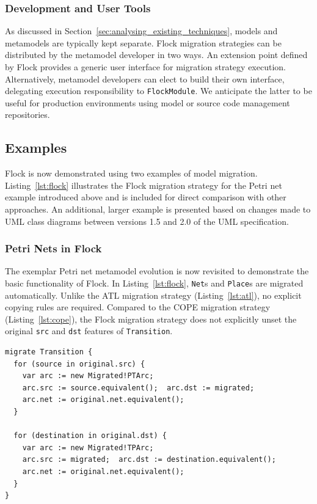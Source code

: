 \subsubsection{Development and User Tools}
As discussed in Section~\ref{sec:analysing_existing_techniques}, models and metamodels are typically kept separate. Flock migration strategies can be distributed by the metamodel developer in two ways. An extension point defined by Flock provides a generic user interface for migration strategy execution. Alternatively, metamodel developers can elect to build their own interface, delegating execution responsibility to \texttt{FlockModule}. We anticipate the latter to be useful for production environments using model or source code management repositories.


\subsection{Examples}
\label{subsec:flock_examples}
Flock is now demonstrated using two examples of model migration. Listing~\ref{lst:flock} illustrates the Flock migration strategy for the Petri net example introduced above and is included for direct comparison with other approaches. An additional, larger example is presented based on changes made to UML class diagrams between versions 1.5 and 2.0 of the UML specification.

\subsubsection{Petri Nets in Flock}
The exemplar Petri net metamodel evolution is now revisited to demonstrate the basic functionality of Flock. In Listing~\ref{lst:flock}, \texttt{Net}s and \texttt{Place}s are migrated automatically. Unlike the ATL migration strategy (Listing~\ref{lst:atl}), no explicit copying rules are required. Compared to the COPE migration strategy (Listing~\ref{lst:cope}), the Flock migration strategy does not explicitly unset the original \texttt{src} and \texttt{dst} features of \texttt{Transition}.

\begin{lstlisting}[caption=Petri nets model migration in Flock, label=lst:flock, language=Flock]
migrate Transition {
  for (source in original.src) {
    var arc := new Migrated!PTArc;
    arc.src := source.equivalent();  arc.dst := migrated;
    arc.net := original.net.equivalent();
  }

  for (destination in original.dst) {
    var arc := new Migrated!TPArc;
    arc.src := migrated;  arc.dst := destination.equivalent();
    arc.net := original.net.equivalent();
  }
}
\end{lstlisting}

